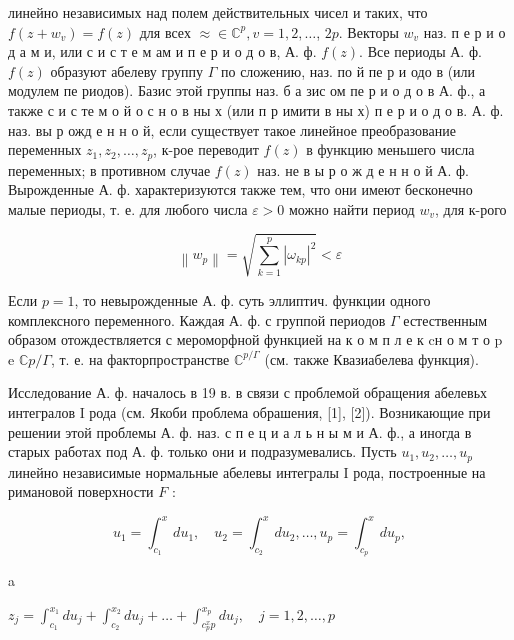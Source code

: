 \documentclass[10pt]{article}
\begin{document}
линейно независимых над полем действительных чисел и таких, что $f\left(z+w_{v}\right)=f(z)$ для всех $\approx \in \mathbb{C}^{p}, v=1,2, \ldots$, $2 p$. Векторы $w_{v}$ наз. п е р и о д а м и, или с и с т е м ам и п е р и о д о в, А. ф. $f(z)$. Все периоды А. ф. $f(z)$ образуют абелеву группу $\Gamma$ по сложению, наз. по й пе р и одо в (или модулем пе риодов). Базис этой группы наз. б а зис ом пе р и о д о в А. ф., а также с и с те м о й о с н о в ны х (или п р имити в ны х) п е р и о д о в. А. ф. наз. вы р ожд е н н о й, если существует такое линейное преобразование переменных $z_{1}, z_{2}, \ldots, z_{p}$, к-рое переводит $f(z)$ в функцию меньшего числа переменных; в противном случае $f(z)$ наз. не в ы р о ж д е н н о й А. ф. Вырожденные А. ф. характеризуются также тем, что они имеют бесконечно малые периоды, т. е. для любого числа $\varepsilon>0$ можно найти период $w_{v}$, для к-рого



\[

\left\|w_{p}\right\|=\sqrt{\sum_{k=1}^{p}\left|\omega_{k p}\right|^{2}}<\varepsilon

\]



Если $p=1$, то невырожденные А. ф. суть эллиптич. функции одного комплексного переменного. Каждая А. ф. с группой периодов $\Gamma$ естественным образом отождествляется с мероморфной функцией на к о м п л е к cн о м т о p e $\mathbb{C} p / \Gamma$, т. е. на факторпространстве $\mathbb{C}^{p / \Gamma}$ (см. также Квазиабелева функция).



Исследование А. ф. началось в 19 в. в связи с проблемой обращения абелевьх интегралов I рода (см. Якоби проблема обрашения, [1], [2]). Возникающие при решении этой проблемы А. ф. наз. с п е ц и а л ь н ы м и А. ф., а иногда в старых работах под А. ф. только они и подразумевались. Пусть $u_{1}, u_{2}, \ldots, u_{p}$ линейно независимые нормальные абелевы интегралы I рода, построенные на римановой поверхности $F$ :



\[

u_{1}=\int_{c_{1}}^{x} d u_{1}, \quad u_{2}=\int_{c_{2}}^{x} d u_{2}, \ldots, u_{p}=\int_{c_{p}}^{x} d u_{p},

\]



a



$z_{j}=\int_{c_{1}}^{x_{1}} d u_{j}+\int_{c_{2}}^{x_{2}} d u_{j}+\ldots+\int_{c_{p}^{x} p}^{x_{p}} d u_{j}, \quad j=1,2, \ldots, p$
\end{document}
